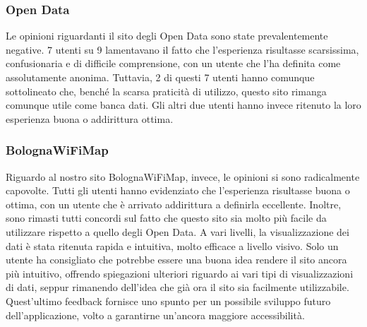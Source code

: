 \subsubsection{Open Data}
Le opinioni riguardanti il sito degli Open Data sono state prevalentemente negative. 7 utenti su 9 lamentavano il fatto che l'esperienza risultasse scarsissima, confusionaria e di difficile comprensione, con un utente che l'ha definita come assolutamente anonima. Tuttavia, 2 di questi 7 utenti hanno comunque sottolineato che, benché la scarsa praticità di utilizzo, questo sito rimanga comunque utile come banca dati. Gli altri due utenti hanno invece ritenuto la loro esperienza buona o addirittura ottima.

\subsubsection{BolognaWiFiMap}
Riguardo al nostro sito BolognaWiFiMap, invece, le opinioni si sono radicalmente capovolte. Tutti gli utenti hanno evidenziato che l'esperienza risultasse buona o ottima, con un utente che è arrivato addirittura a definirla eccellente. Inoltre, sono rimasti tutti concordi sul fatto che questo sito sia molto più facile da utilizzare rispetto a quello degli Open Data. A vari livelli, la visualizzazione dei dati è stata ritenuta rapida e intuitiva, molto efficace a livello visivo. Solo un utente ha consigliato che potrebbe essere una buona idea rendere il sito ancora più intuitivo, offrendo spiegazioni ulteriori riguardo ai vari tipi di visualizzazioni di dati, seppur rimanendo dell'idea che già ora il sito sia facilmente utilizzabile. Quest'ultimo feedback fornisce uno spunto per un possibile sviluppo futuro dell'applicazione, volto a garantirne un'ancora maggiore accessibilità.

